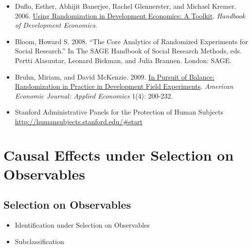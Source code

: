 \documentclass{article}
\begin{document}
\begin{itemize}

\item Duflo, Esther, Abhijit Banerjee, Rachel Glennerster, and Michael Kremer. 2006.  \href{http://economics.mit.edu/files/806}{Using Randomization in Development Economics: A Toolkit}. \textit{Handbook of Development Economics}.

\item Bloom, Howard S. 2008. ``The Core Analytics of Randomized Experiments for Social Research.'' In The SAGE Handbook of Social Research Methods, eds. Pertti Alasuutar, Leonard Bickman, and Julia Brannen. London: SAGE.

\item Bruhn, Miriam, and David McKenzie. 2009. \href{http://pubs.aeaweb.org/doi/pdfplus/10.1257/app.1.4.200}{In Pursuit of Balance: Randomization in Practice in Development Field Experiments}. \textit{American Economic Journal: Applied Economics} 1(4): 200-232.


\item Stanford Administrative Panels for the Protection of Human Subjects\\ \href{http://humansubjects.stanford.edu/\#start}{http://humansubjects.stanford.edu/\#start}

\end{itemize}

\section{Causal Effects under Selection on Observables}

\subsection{Selection on Observables}
\begin{itemize}
\item Identification under Selection on Observables
\item Subclassification
\end{itemize}
\end{document}
